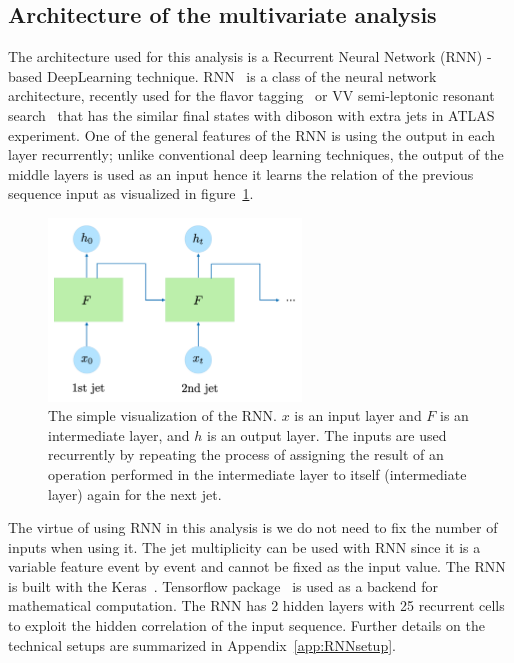 \subsection{Architecture of the multivariate analysis}
The architecture used for this analysis is a Recurrent Neural Network (RNN) - based DeepLearning technique.
RNN~\cite{Sherstinsky_2020} is a class of the neural network architecture, recently used for the flavor tagging~\cite{ATL-PHYS-PUB-2017-003} or VV semi-leptonic resonant search~\cite{HDBS-2018-10} that has the similar final states with diboson with extra jets in ATLAS experiment.
One of the general features of the RNN is using the output in each layer recurrently; unlike conventional deep learning techniques, the output of the middle layers is used as an input hence it learns the relation of the previous sequence input as visualized in figure~\ref{fig:RNNmodel}. 
\begin{figure}[H]
    \centering
    \includegraphics[width=0.6\textwidth]{figures/RNNmodel}
    \caption{The simple visualization of the RNN. $x$ is an input layer and $F$ is an intermediate layer, and $h$ is an output layer. The inputs are used recurrently by repeating the process of assigning the result of an operation performed in the intermediate layer to itself (intermediate layer) again for the next jet.
    }
    \label{fig:RNNmodel}
\end{figure}
The virtue of using RNN in this analysis is we do not need to fix the number of inputs when using it.
The jet multiplicity can be used with RNN since it is a variable feature event by event and cannot be fixed as the input value.
The RNN is built with the Keras~\cite{chollet2015keras}. 
Tensorflow package~\cite{tensorflow2015-whitepaper} is used as a backend for mathematical computation. 
The RNN has 2 hidden layers with 25 recurrent cells to exploit the hidden correlation of the input sequence.
Further details on the technical setups are summarized in Appendix~\ref{app:RNNsetup}.

